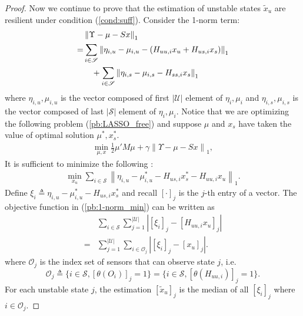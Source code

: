 \documentclass[12pt]{article}
\newcommand{\Uc}{{\mathcal{U}}}
\newcommand{\Sc}{{\mathcal{S}}}
\newcommand{\Oc}{{\mathcal{O}}}
\newcommand{\Ss}{{\mathscr{S}}}
\newtheorem*{proof}{\textbf{Proof}}
\begin{document}
\begin{proof}
Now we continue to prove that the estimation of unstable states $\tilde{x}_u$ are resilient under condition (\ref{cond:suff}).
Consider the 1-norm term:
\begin{align*}
 &\left\| \Upsilon-\mu-S x \right\|_1 \\
=&\sum_{i\in\Ss} 
\left\|\eta_{i,u}-\mu_{i,u}-(H_{uu,i} x_u + H_{us,i} x_s) \right\|_1 \notag \\
&\quad + \sum_{i\in\Ss} \left\|\eta_{i,s}-\mu_{i,s}- H_{ss,i} x_s \right\|_1 
\end{align*}
where $\eta_{i,u}, \mu_{i,u}$ is the vector composed of first $|\Uc|$ element of $\eta_{i}, \mu_{i}$ and 
$\eta_{i,s}, \mu_{i,s}$ is the vector composed of last $|\Sc|$ element of $\eta_{i}, \mu_{i}$.
Notice that we are optimizing the following problem (\ref{pb:LASSO_free}) and suppose $\mu$ and $x_s$ have taken the value of optimal solution $\mu^*, x_s^*$.
\begin{align}\label{pb:LASSO_free}
	\min _{\mu,x} \frac{1}{2} \mu{'} M \mu+\gamma\left\|\Upsilon-\mu-S x\right\|_1 ,
\end{align}
It is sufficient to minimize the following :
\begin{align}\label{pb:1-norm_min}
 \min_{x_u} \sum_{i\in\Ss} \left\|\eta_{i,u}-\mu^*_{i,u}- H_{us,i} x^*_s - H_{uu,i} x_u \right\|_1  .
\end{align}
Define $\xi_i\triangleq \eta_{i,u}-\mu^*_{i,u}- H_{us,i} x^*_s $ and recall $[\cdot]_j$ is the $j$-th entry of a vector. The objective function in (\ref{pb:1-norm_min}) can be written as 
\begin{align*}
 &\sum_{i\in\Ss}\sum_{j=1}^{|\Uc|} \left| [\xi_i]_j -[H_{uu,i} x_u]_j \right| \\
=&\sum_{j=1}^{|\Uc|}\sum_{i\in\Oc_j} \left| [\xi_i]_j -[x_u]_j \right| .
\end{align*}
where $\Oc_j$ is the index set of sensors that can observe state $j$, i.e.
\begin{equation*}
	\Oc_j\triangleq \{i\in\Ss, [\theta(O_i)]_j = 1\}=\{i\in\Ss, [\theta(H_{uu,i})]_j = 1\}.
\end{equation*}
For each unstable state $j$, the estimation $[\tilde{x}_u]_j$ is the median of all $[\xi_i]_j$ where $i\in\Oc_j$. 



\end{proof}
\end{document}
